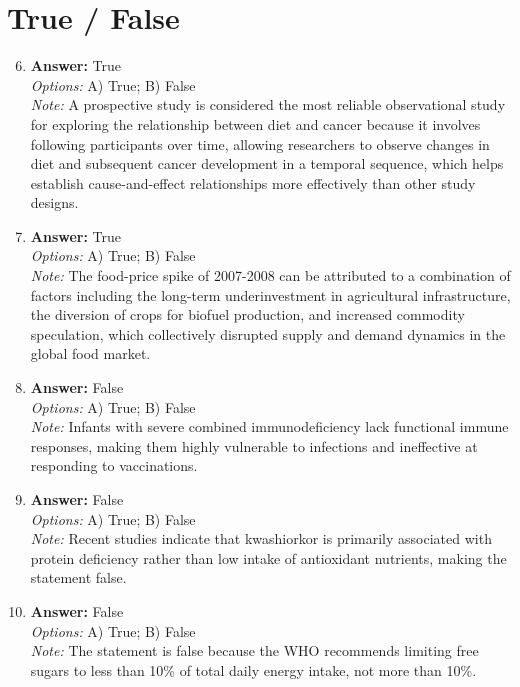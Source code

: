 \documentclass[12pt]{article}
\begin{document}
\section*{True / False}
\begin{enumerate}[label=\arabic*.]
\setcounter{enumi}{5}
\item \textbf{Answer:} True
\\ \textit{Options:} A) True; B) False
\\ \textit{Note:} A prospective study is considered the most reliable observational study for exploring the relationship between diet and cancer because it involves following participants over time, allowing researchers to observe changes in diet and subsequent cancer development in a temporal sequence, which helps establish cause-and-effect relationships more effectively than other study designs.
\item \textbf{Answer:} True
\\ \textit{Options:} A) True; B) False
\\ \textit{Note:} The food-price spike of 2007-2008 can be attributed to a combination of factors including the long-term underinvestment in agricultural infrastructure, the diversion of crops for biofuel production, and increased commodity speculation, which collectively disrupted supply and demand dynamics in the global food market.
\item \textbf{Answer:} False
\\ \textit{Options:} A) True; B) False
\\ \textit{Note:} Infants with severe combined immunodeficiency lack functional immune responses, making them highly vulnerable to infections and ineffective at responding to vaccinations.
\item \textbf{Answer:} False
\\ \textit{Options:} A) True; B) False
\\ \textit{Note:} Recent studies indicate that kwashiorkor is primarily associated with protein deficiency rather than low intake of antioxidant nutrients, making the statement false.
\item \textbf{Answer:} False
\\ \textit{Options:} A) True; B) False
\\ \textit{Note:} The statement is false because the WHO recommends limiting free sugars to less than 10\% of total daily energy intake, not more than 10\%.
\end{enumerate}
\end{document}
